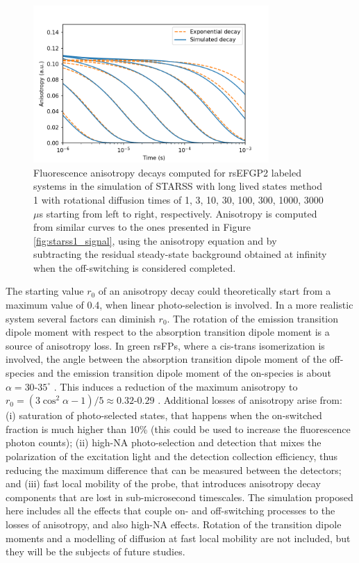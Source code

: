 \documentclass{article}
\begin{document}
\begin{figure}[h!]
    \centering
    \includegraphics[width=0.8\textwidth]
    {figures/starss1_anisotropy_exponential_decays.png}
    \caption[Simulated fluorescence anisotropy decays of STARSS method 1]
    {Fluorescence anisotropy decays computed for rsEFGP2 labeled systems in the simulation of STARSS with long lived states method 1 with rotational diffusion times of 1, 3, 10, 30, 100, 300, 1000, 3000 $\mu$s starting from left to right, respectively. Anisotropy is computed from similar curves to the ones presented in Figure \ref{fig:starss1_signal}, using the anisotropy equation and by subtracting the residual steady-state background obtained at infinity when the off-switching is considered completed.}
    \label{fig:starss1_anisotropy}
\end{figure}

The starting value $r_0$ of an anisotropy decay could theoretically start from a maximum value of 0.4, when linear photo-selection is involved. In a more realistic system several factors can diminish $r_0$.
The rotation of the emission transition dipole moment with respect to the absorption transition dipole moment is a source of anisotropy loss. In green rsFPs, where a cis-trans isomerization is involved, the angle between the absorption transition dipole moment of the off-species and the emission transition dipole moment of the on-species is about $\alpha=30$-$35^\circ$ \cite{Yadav2015}. This induces a reduction of the maximum anisotropy to $r_0 = (3 \cos^2 \alpha -1)/5 \approx 0.32$-$0.29$ \cite{LakowiczBook}.
Additional losses of anisotropy arise from: (i) saturation of photo-selected states, that happens when the on-switched fraction is much higher than 10\% (this could be used to increase the fluorescence photon counts); (ii) high-NA photo-selection and detection that mixes the polarization of the excitation light and the detection collection efficiency, thus reducing the maximum difference that can be measured between the detectors; and (iii) fast local mobility of the probe, that introduces anisotropy decay components that are lost in sub-microsecond timescales.
The simulation proposed here includes all the effects that couple on- and off-switching processes to the losses of anisotropy, and also high-NA effects. Rotation of the transition dipole moments and a modelling of diffusion at fast local mobility are not included, but they will be the subjects of future studies.
\end{document}
